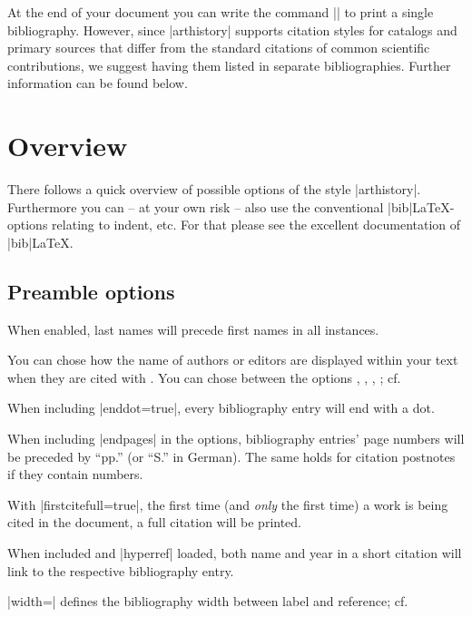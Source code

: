 \documentclass[a4paper,
10pt,
ngerman,
english
]{ltxdoc}
\begin{document}
At the end of your document you can write the command |\printbibliography| to print 
a single bibliography.
However, since |arthistory| supports citation styles for catalogs and primary sources that differ from the standard citations of common scientific contributions, we suggest having them listed in separate bibliographies. 
Further information can be found below. %

\section{Overview}\label{overview}
There follows a quick overview of possible options of the style |arthistory|. 
Furthermore you can -- at your own risk -- also use the conventional |bib|\LaTeX-options relating to indent, etc. 
For that please see the excellent documentation of  |bib|\LaTeX.

\subsection{Preamble options}\label{preamble_options}

When enabled, last names will precede first names in all instances.

You can chose how the name of authors or editors are displayed within your text when they are cited with .
You can chose between the options , , , ; 
cf. %

When including |enddot=true|, every bibliography entry will end with a dot.

When including |endpages| in the options, bibliography entries' page numbers will be preceded by \enquote{pp.} (or \enquote{S.} in German). The same holds for citation postnotes if they contain numbers.

With |firstcitefull=true|, the first time (and \emph{only} the first time) a work is being cited in the document, a full citation will be printed.

When included and |hyperref| loaded, both name and year in a short citation will link to the respective bibliography entry.

|width=| defines the bibliography width between label and reference; cf. %
\end{document}
